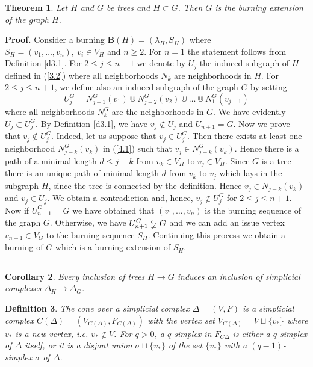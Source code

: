 \documentclass[a4paper, 11pt]{article}
\newtheorem{theorem}{Theorem}[section]
\newtheorem{corollary}[theorem]{Corollary}
\newtheorem{definition}[theorem]{Definition}
\newenvironment{proof}[1][Proof]{\textbf{#1.} }{\ \rule{0.5em}{0.5em}}
\begin{document}
\begin{theorem}\label{t4.16}  Let $H$ and $G$ be trees and $H\subset G$. 
Then $G$ is the burning extension of the graph $H$. 
\end{theorem} 
\begin{proof} Consider a burning $\mathbf B(H)=(\lambda_H, S_H)$ where 
$S_H=(v_1, \dots, v_n), \  v_i\in V_H$ and $n\geq 2$. For $n=1$ the statement  follows from Definition \ref{d3.1}.   For  $2\leq j\leq n+1$ we denote by  
$U_j$  the  induced subgraph of $H$ defined  in (\ref{3.2}) where all  neighborhoods $N_k$ are  neighborhoods in $H$.   For  $2\leq j\leq n+1$, we define also an  induced subgraph of the graph $G$ by setting 
\begin{equation}\label{4.1}
U_j^G=N_{j-1}^G (v_1)\Cup N_{j-2}^G(v_2)\Cup \dots \Cup N_1^G(v_{j-1})
\end{equation}
where all  neighborhoods $N_k^G$ are the neighborhoods in $G$. 
We have evidently  $U_j\subset U_j^G$. By Definition \ref{d3.1}, we have  $v_j\notin U_j$ and $U_{n+1}=G$.  Now we prove that $v_j\notin U_j^G$. Indeed, 
let us suppose that $v_j\in U_j^G$. Then there exists at least one neighborhood 
$N_{j-k}^G(v_k)$ in (\ref{4.1})  such that $v_j\in N_{j-k}^G(v_k)$. Hence there  is a path of a minimal length $d\leq j-k$ from $v_k\in V_H$ to $v_j\in V_H$. Since $G$ is a tree  there is an unique path of minimal length $d$ from 
$v_k$ to $v_j$ which lays in  the subgraph $H$, since the tree is connected by the definition. Hence $v_j \in  N_{j-k}(v_k)$ and  
$v_j\in U_j$. We obtain a contradiction and, hence, $v_j\notin U_j^G$ for  $2\leq j\leq n+1$. Now if $U_{n+1}^G=G$ we have obtained that $(v_1, \dots, v_n)$ is the burning sequence of the graph $G$. Otherwise, we have  
$U_{n+1}^G\varsubsetneqq G$ and we can  add an  issue vertex $v_{n+1}\in V_G$ to the burning sequence $S_H$. Continuing this process we obtain a burning of $G$ which is a burning extension of $S_H$. 
\end{proof} 

\begin{corollary}\label{c4.17}   Every inclusion of trees $H\to  G$  induces   an inclusion of simplicial complexes $\Delta_H\to \Delta_G$. 
\end{corollary} 


 





\begin{definition}\label{d4.18} \rm The \emph{cone over a simplicial complex} 
$\Delta=(V,F)$ is a simplicial complex 
$C(\Delta)=(V_{C(\Delta)}, F_{C(\Delta)})$ with the  vertex set 
 $V_{C(\Delta)}= V\sqcup\{v_*\}$  where $v_*$ is a new vertex, i.e. $v_*\not \in V$. 
 For $q>0$, a  $q$-simplex in $F_{C\Delta}$
is either a $q$-simplex of $\Delta$  itself, or it is  a disjont union $\sigma \sqcup \{v_*\}$ of the set  $ \{v_*\}$  with a $(q - 1)$-simplex  $\sigma$  of $\Delta$.
\end{definition} 
\end{document}
